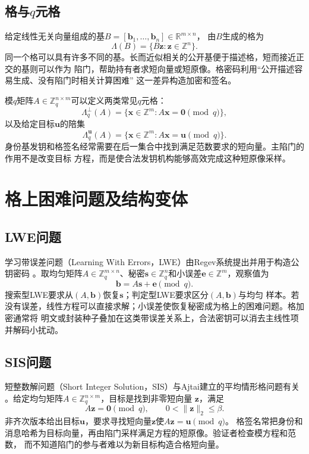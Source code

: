 \subsection{格与$q$元格}

给定线性无关向量组成的基$B=[\mathbf b_1,\ldots,\mathbf b_n]\in\mathbb R^{m\times n}$，
由$B$生成的格为
\[
  \Lambda(B)=\{B\mathbf z:\mathbf z\in\mathbb Z^n\}.
\]
同一个格可以具有许多不同的基。长而近似相关的公开基便于描述格，短而接近正交的基则可以作为
陷门，帮助持有者求短向量或短原像。格密码利用“公开描述容易生成、没有陷门时相关计算困难”
这一差异构造加密和签名。

模$q$矩阵$A\in\mathbb Z_q^{n\times m}$可以定义两类常见$q$元格：
\[
 \Lambda_q^\perp(A)=\{\mathbf x\in\mathbb Z^m:A\mathbf x=\mathbf0\pmod q\},
\]
以及给定目标$\mathbf u$的陪集
\[
 \Lambda_q^{\mathbf u}(A)=\{\mathbf x\in\mathbb Z^m:A\mathbf x=\mathbf u\pmod q\}.
\]
身份基发钥和格签名经常需要在后一集合中找到满足范数要求的短向量。主陷门的作用不是改变目标
方程，而是使合法发钥机构能够高效完成这种短原像采样。

\section{格上困难问题及结构变体}

\subsection{LWE问题}

学习带误差问题（Learning With Errors，LWE）由Regev系统提出并用于构造公钥密码
\cite{regev2005lwe}。取均匀矩阵$A\in\mathbb Z_q^{m\times n}$、秘密$\mathbf s\in\mathbb
Z_q^n$和小误差$\mathbf e\in\mathbb Z^m$，观察值为
\[
  \mathbf b=A\mathbf s+\mathbf e\pmod q.
\]
搜索型LWE要求从$(A,\mathbf b)$恢复$\mathbf s$；判定型LWE要求区分$(A,\mathbf b)$与均匀
样本。若没有误差，线性方程可以直接求解；小误差使恢复秘密成为格上的困难问题。格加密通常将
明文或封装种子叠加在这类带误差关系上，合法密钥可以消去主线性项并解码小扰动。

\subsection{SIS问题}

短整数解问题（Short Integer Solution，SIS）与Ajtai建立的平均情形格问题有关
\cite{ajtai1996}。给定均匀矩阵$A\in\mathbb Z_q^{n\times m}$，目标是找到非零短向量
$\mathbf z$，满足
\[
 A\mathbf z=\mathbf0\pmod q,
 \qquad 0<\lVert\mathbf z\rVert_2\leq\beta.
\]
非齐次版本给出目标$\mathbf u$，要求寻找短向量$\mathbf z$使$A\mathbf z=\mathbf u\pmod q$。
格签名常把身份和消息哈希为目标向量，再由陷门采样满足方程的短原像。验证者检查模方程和范数，
而不知道陷门的参与者难以为新目标构造合格短向量。

